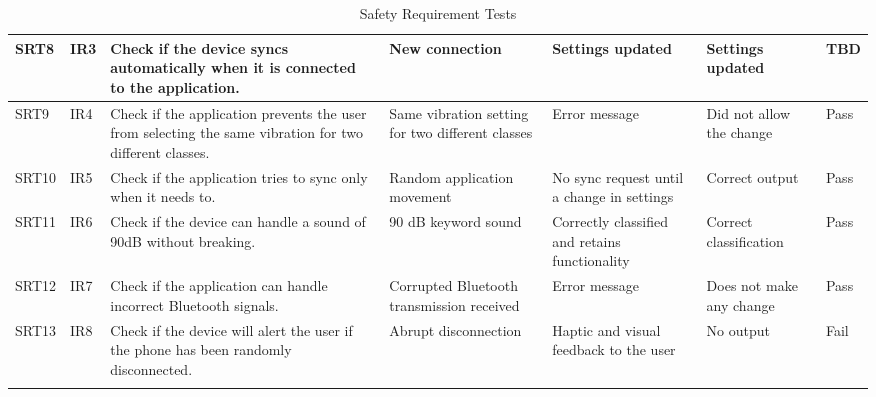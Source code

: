 \documentclass[12pt, titlepage]{article}
\begin{document}
\begin{longtable}{|p{1.4cm}|p{1.1cm}|p{2.5cm}|p{1.5cm}|p{2.2cm}|p{1.9cm}|p{1.2cm}|}
  SRT8                              & IR3                               & Check if the device syncs automatically when it is connected to the application.                                                 & New connection                                   & Settings updated                                             & Settings updated                          & {\color[HTML]{F8A102} TBD}             \\ \hline
  SRT9                              & IR4                               & Check if the application prevents the user from selecting the same vibration for two different classes.                          & Same vibration setting for two different classes & Error message                                                & Did not allow the change                  & {\color[HTML]{32CB00} Pass}            \\ \hline
  SRT10                             & IR5                               & Check if the application tries to sync only when it needs to.                                                                    & Random application movement                      & No sync request until a change in settings                   & Correct output                            & {\color[HTML]{32CB00} Pass}             \\ \hline
  SRT11                             & IR6                               & Check if the device can handle a sound of 90dB without breaking.                                                                 & 90 dB keyword sound                              & Correctly classified and retains functionality               & Correct classification                    & {\color[HTML]{32CB00} Pass}             \\ \hline
  SRT12                             & IR7                               & Check if the application can handle incorrect Bluetooth signals.                                                                 & Corrupted Bluetooth transmission received        & Error message                                                & Does not make any change                  & {\color[HTML]{32CB00} Pass}             \\ \hline
  SRT13                             & IR8                               & Check if the device will alert the user if the phone has been randomly disconnected.                                             & Abrupt disconnection                             & Haptic and visual feedback to the user                       & No output                                 & {\color[HTML]{FE0000} Fail}             \\ \hline
  \caption{Safety Requirement Tests}
  \label{tab:my-table}\\
\end{longtable}
\end{document}

